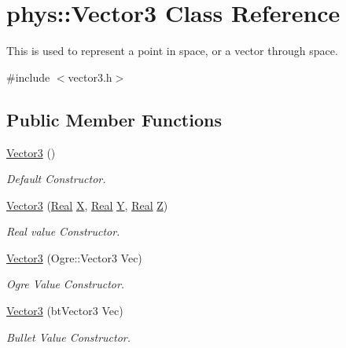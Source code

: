 \hypertarget{classphys_1_1Vector3}{
\section{phys::Vector3 Class Reference}
\label{d5/d6a/classphys_1_1Vector3}
}


This is used to represent a point in space, or a vector through space.  




{\ttfamily \#include $<$vector3.h$>$}

\subsection*{Public Member Functions}
\begin{DoxyCompactItemize}
\item 
\hyperlink{classphys_1_1Vector3_af328c400a03fdb8d2a99fd58382d61cb}{Vector3} ()
\begin{DoxyCompactList}\small\item\em Default Constructor. \item\end{DoxyCompactList}\item 
\hyperlink{classphys_1_1Vector3_af1d323b44d7b6ee3d0a79a196d9967da}{Vector3} (\hyperlink{namespacephys_af7eb897198d265b8e868f45240230d5f}{Real} \hyperlink{classphys_1_1Vector3_a23660f9d1e21a25c53aa06aa737bb56b}{X}, \hyperlink{namespacephys_af7eb897198d265b8e868f45240230d5f}{Real} \hyperlink{classphys_1_1Vector3_a6c9bc2ab0995d5056dba8272c650e58e}{Y}, \hyperlink{namespacephys_af7eb897198d265b8e868f45240230d5f}{Real} \hyperlink{classphys_1_1Vector3_a53c84fa4b38fb9c4a4d822b04c200b13}{Z})
\begin{DoxyCompactList}\small\item\em Real value Constructor. \item\end{DoxyCompactList}\item 
\hyperlink{classphys_1_1Vector3_ad19c9ae00070b3aad5799e1f8c00bd34}{Vector3} (Ogre::Vector3 Vec)
\begin{DoxyCompactList}\small\item\em Ogre Value Constructor. \item\end{DoxyCompactList}\item 
\hyperlink{classphys_1_1Vector3_a8ff2e969410341eaf328ab76fb3099ed}{Vector3} (btVector3 Vec)
\begin{DoxyCompactList}\small\item\em Bullet Value Constructor. \item\end{DoxyCompactList}\item 

\end{DoxyCompactItemize}
